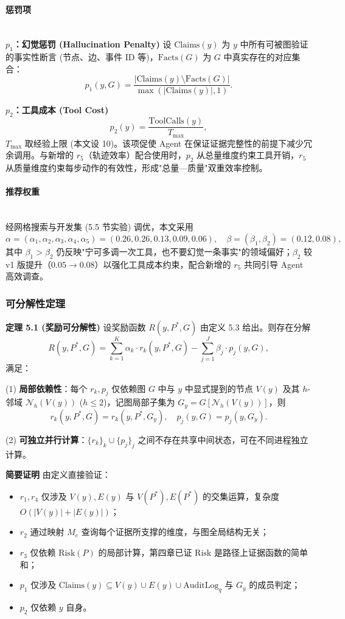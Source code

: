\documentclass[a4paper,12pt]{ctexart}
\begin{document}
\paragraph{惩罚项}\mbox{}\\

\textbf{$p_1$：幻觉惩罚 (Hallucination Penalty)} 设 $\mathrm{Claims}(y)$ 为 $y$ 中所有可被图验证的事实性断言 (节点、边、事件 ID 等)，$\mathrm{Facts}(G)$ 为 $G$ 中真实存在的对应集合：
\[p_1(y,G)=\frac{|\mathrm{Claims}(y)\setminus \mathrm{Facts}(G)|}{\max(|\mathrm{Claims}(y)|,1)}.\]

\textbf{$p_2$：工具成本 (Tool Cost)}
\[p_2(y)=\frac{\mathrm{ToolCalls}(y)}{T_{\max}},\]
$T_{\max}$ 取经验上限 (本文设 10)。该项促使 Agent 在保证证据完整性的前提下减少冗余调用。与新增的 $r_5$（轨迹效率）配合使用时，$p_2$ 从总量维度约束工具开销，$r_5$ 从质量维度约束每步动作的有效性，形成"总量—质量"双重效率控制。

\paragraph{推荐权重}\mbox{}\\

经网格搜索与开发集 (5.5 节实验) 调优，本文采用
\[\alpha=(\alpha_1,\alpha_2,\alpha_3,\alpha_4,\alpha_5)=(0.26,0.26,0.13,0.09,0.06),\quad \beta=(\beta_1,\beta_2)=(0.12,0.08),\]
其中 $\beta_1>\beta_2$ 仍反映"宁可多调一次工具，也不要幻觉一条事实"的领域偏好；$\beta_2$ 较 v1 版提升（$0.05\to 0.08$）以强化工具成本约束，配合新增的 $r_5$ 共同引导 Agent 高效调查。

\subsubsection{可分解性定理}

\textbf{定理 5.1 (奖励可分解性)} 设奖励函数 $R(y,P^*,G)$ 由定义 5.3 给出。则存在分解
\[R(y,P^*,G)=\sum_{k=1}^{K}\alpha_k\cdot r_k(y,P^*,G)-\sum_{j=1}^{J}\beta_j\cdot p_j(y,G),\]
满足：

(1) \textbf{局部依赖性}：每个 $r_k,p_j$ 仅依赖图 $G$ 中与 $y$ 中显式提到的节点 $V(y)$ 及其 $h$-邻域 $\mathcal{N}_h(V(y))$ ($h\leq 2$)，记图局部子集为 $G_y=G[\mathcal{N}_h(V(y))]$，则
\[r_k(y,P^*,G)=r_k(y,P^*,G_y),\quad p_j(y,G)=p_j(y,G_y).\]

(2) \textbf{可独立并行计算}：$\{r_k\}_k\cup\{p_j\}_j$ 之间不存在共享中间状态，可在不同进程独立计算。

\textbf{简要证明} 由定义直接验证：
\begin{itemize}[leftmargin=*]
\item $r_1,r_4$ 仅涉及 $V(y),E(y)$ 与 $V(P^*),E(P^*)$ 的交集运算，复杂度 $O(|V(y)|+|E(y)|)$；
\item $r_2$ 通过映射 $M_e$ 查询每个证据所支撑的维度，与图全局结构无关；
\item $r_3$ 仅依赖 $\mathrm{Risk}(P)$ 的局部计算，第四章已证 $\mathrm{Risk}$ 是路径上证据函数的简单和；
\item $p_1$ 仅涉及 $\mathrm{Claims}(y)\subseteq V(y)\cup E(y)\cup \mathrm{AuditLog}_q$ 与 $G_y$ 的成员判定；
\item $p_2$ 仅依赖 $y$ 自身。
\end{itemize}
\end{document}
